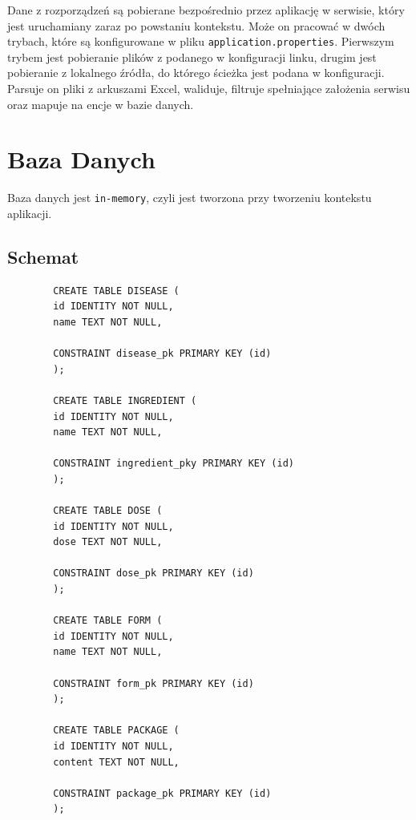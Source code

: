 \documentclass{article}
\begin{document}
    Dane z rozporządzeń są pobierane bezpośrednio przez aplikację w serwisie, który jest uruchamiany zaraz po powstaniu kontekstu.
    Może on pracować w dwóch trybach, które są konfigurowane w pliku \texttt{application.properties}.
    Pierwszym trybem jest pobieranie plików z podanego w konfiguracji linku,
    drugim jest pobieranie z lokalnego źródła, do którego ścieżka jest podana w konfiguracji.
    Parsuje on pliki z arkuszami Excel, waliduje, filtruje spełniające założenia serwisu oraz mapuje na encje w bazie danych.
  \section{Baza Danych}
  Baza danych jest \texttt{in-memory}, czyli jest tworzona przy tworzeniu kontekstu aplikacji.

  \subsection{Schemat}
    \noindent
    \begin{minipage}{.45\textwidth}
      \begin{lstlisting}
        CREATE TABLE DISEASE (
        id IDENTITY NOT NULL,
        name TEXT NOT NULL,

        CONSTRAINT disease_pk PRIMARY KEY (id)
        );

        CREATE TABLE INGREDIENT (
        id IDENTITY NOT NULL,
        name TEXT NOT NULL,

        CONSTRAINT ingredient_pky PRIMARY KEY (id)
        );

        CREATE TABLE DOSE (
        id IDENTITY NOT NULL,
        dose TEXT NOT NULL,

        CONSTRAINT dose_pk PRIMARY KEY (id)
        );

        CREATE TABLE FORM (
        id IDENTITY NOT NULL,
        name TEXT NOT NULL,

        CONSTRAINT form_pk PRIMARY KEY (id)
        );

        CREATE TABLE PACKAGE (
        id IDENTITY NOT NULL,
        content TEXT NOT NULL,

        CONSTRAINT package_pk PRIMARY KEY (id)
        );
      \end{lstlisting}
    \end{minipage}\hfill
\end{document}
